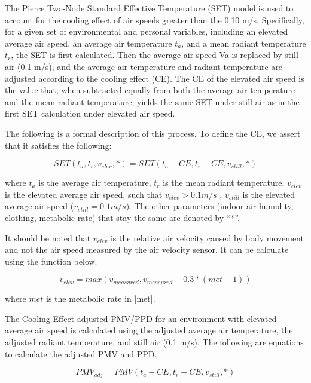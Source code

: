 The Pierce Two-Node Standard Effective Temperature (SET) model is used to account for the cooling effect of air speeds greater than the 0.10 m/s. Specifically, for a given set of environmental and personal variables, including an elevated average air speed, an average air temperature \(t_{a}\), and a mean radiant temperature \(t_{r}\), the SET is first calculated. Then the average air speed Va is replaced by still air (0.1 m/s), and the average air temperature and radiant temperature are adjusted according to the cooling effect (CE). The CE of the elevated air speed is the value that, when subtracted equally from both the average air temperature and the mean radiant temperature, yields the same SET under still air as in the first SET calculation under elevated air speed.

The following is a formal description of this process. To define the CE, we assert that it satisfies the following:

\begin{equation}
SET(t_{a}, t_{r}, v_{elev}, *) = SET(t_{a} - CE, t_{r} - CE, v_{still}, *) 
\end{equation}

where \(t_{a}\) is the average air temperature, \(t_{r}\) is the mean radiant temperature, \(v_{elev}\) is the elevated average air speed, such that \(v_{elev} > 0.1 m/s\) , \(v_{still}\) is the elevated average air speed (\(v_{still} = 0.1 m/s\)). The other parameters (indoor air humidity, clothing, metabolic rate) that stay the same are denoted by “*”.

It should be noted that \(v_{elev}\) is the relative air velocity caused by body movement and not the air speed measured by the air velocity sensor. It can be calculate using the function below.

\begin{equation}
v_{elev} = max(v_{measured}, v_{measured} + 0.3 * (met - 1))
\end{equation}

where \(met\) is the metabolic rate in [met].

The Cooling Effect adjusted PMV/PPD for an environment with elevated average air speed is calculated using the adjusted average air temperature, the adjusted radiant temperature, and still air (0.1 m/s). The following are equations to calculate the adjusted PMV and PPD.

\begin{equation}
PMV_{adj} = PMV(t_{a} - CE, t_{r} - CE, v_{still}, *)
\end{equation}


